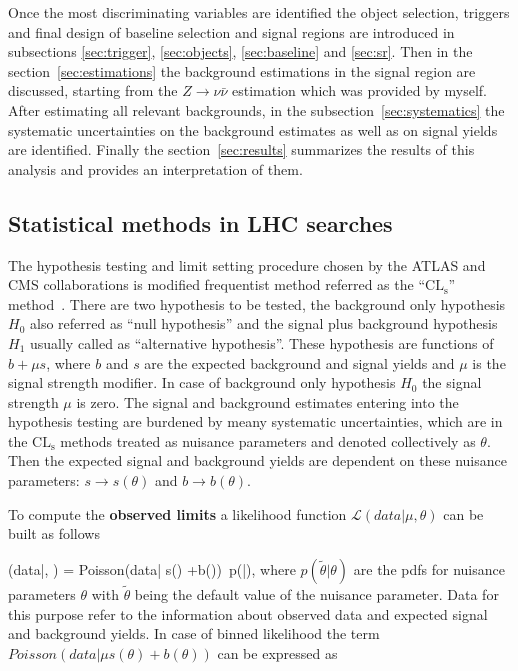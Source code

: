 Once the most discriminating variables are identified the object selection, triggers and final design of baseline selection and signal regions are introduced in subsections \ref{sec:trigger}, \ref{sec:objects}, \ref{sec:baseline} and \ref{sec:sr}. Then in the section~\ref{sec:estimations} the background estimations in the signal region are discussed, starting from the $Z \to \nu \bar{\nu}$ estimation which was provided by myself. After estimating all relevant backgrounds, in the subsection~\ref{sec:systematics} the systematic uncertainties on the background estimates as well as on signal yields are identified. Finally the section~\ref{sec:results} summarizes the results of this analysis and provides an interpretation of them. 



\subsection{Statistical methods in LHC searches~\label{sec:stats} }

The hypothesis testing and limit setting procedure chosen by the ATLAS and CMS collaborations is modified frequentist method referred as the ``$\mathrm{CL_{s}}$'' method~\cite{Read:2002hq, Junk:1999kv, Cowan:2010js, CMS-NOTE-2011-005}. There are two hypothesis to be tested, the background only hypothesis $H_{0}$ also referred as ``null hypothesis'' and the signal plus background hypothesis $H_{1}$ usually called as ``alternative hypothesis''. These hypothesis are functions of $b+\mu s$, where $b$ and $s$ are the expected background and signal yields and $\mu$ is the signal strength modifier. In case of background only hypothesis $H_{0}$ the signal strength $\mu$ is zero. The signal and background estimates entering into the hypothesis testing are burdened by meany systematic uncertainties, which are in the $\mathrm{CL_{s}}$ methods treated as nuisance parameters and denoted collectively as $\theta$. Then the expected signal and background yields are dependent on these nuisance parameters: $s \to s(\theta)$ and $b \to b(\theta)$.

To compute the \textbf{observed limits} a likelihood function $\mathcal{L}(data|\mu, \theta)$ can be built as follows

{
(data|\mu, \theta) = Poisson(data| \mu s(\theta) +b(\theta))~p(\tilde{\theta}|\theta),
}
where $p(\tilde{\theta}|\theta)$ are the pdfs for nuisance parameters $\theta$ with $\tilde{\theta}$ being the default value of the nuisance parameter. Data for this purpose refer to the information about observed data and expected signal and background yields. In case of binned likelihood the term $Poisson(data| \mu s(\theta) +b(\theta))$ can be expressed as


